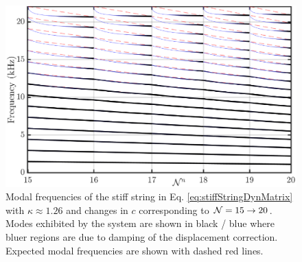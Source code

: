 \documentclass[fleqn]{jaes}
\begin{document}
\begin{figure}[t]
    \centering
    \includegraphics[width=\columnwidth]{stiffStringModes.eps}
    \caption{Modal frequencies of the stiff string in Eq. \eqref{eq:stiffStringDynMatrix} with $\kappa \approx 1.26$ and changes in $c$ corresponding to $\mathcal{N} = 15 \rightarrow 20$. Modes exhibited by the system are shown in black / blue where bluer regions are due to damping of the displacement correction. Expected modal frequencies are shown with dashed red lines.}
    \label{fig:resultsStiffString}
\end{figure}


\end{document}
